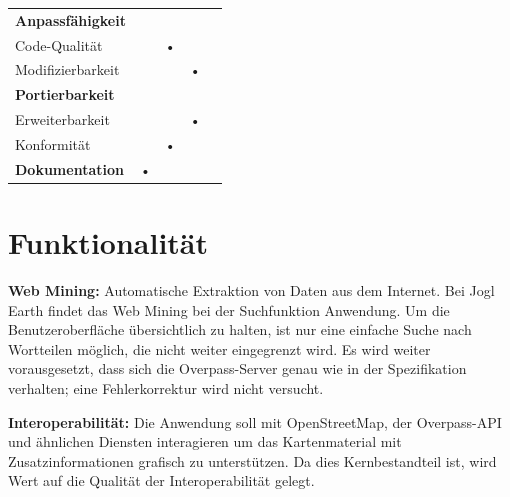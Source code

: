 \documentclass[10pt]{scrreprt}
\newenvironment{details}[1][6pt]{%
  \parskip#1 \parindent6mm \raggedright%
  \def\item{\par\ignorespaces\hangindent=5mm \hangafter1}}{%
  \par\ignorespaces}
\newcommand{\sfbf}[1]{\textbf{\sffamily #1}}
\begin{document}
\begin{center}
\begin{tabular}{lcccc}
\hline 
\rule[-1ex]{0pt}{4ex} \textbf{Anpassfähigkeit} &  &  &  &  \\ 
\rule[-1ex]{0pt}{4ex} \hspace{10pt} Code-Qualität & & • & & \\ 
\rule[-1ex]{0pt}{4ex} \hspace{10pt} Modifizierbarkeit & & & • & \\ 

\hline 
\rule[-1ex]{0pt}{4ex} \textbf{Portierbarkeit} &  &  &  &  \\ 
\rule[-1ex]{0pt}{4ex} \hspace{10pt} Erweiterbarkeit & & & • & \\ 
\rule[-1ex]{0pt}{4ex} \hspace{10pt} Konformität & & • & & \\ 

\hline 
\rule[-1ex]{0pt}{4ex} \textbf{Dokumentation} & • & & & \\ 
\hline 
\end{tabular} 
\end{center}

\pagebreak



\section*{Funktionalität}
\begin{details}
\item \sfbf{Web Mining:} Automatische Extraktion von Daten aus dem Internet. Bei Jogl Earth findet das Web Mining bei der Suchfunktion Anwendung. Um die Benutzeroberfläche übersichtlich zu halten, ist nur eine einfache Suche nach Wortteilen möglich, die nicht weiter eingegrenzt wird. Es wird weiter vorausgesetzt, dass sich die Overpass-Server genau wie in der Spezifikation verhalten; eine Fehlerkorrektur wird nicht versucht.

\item \textbf{Interoperabilität:} Die Anwendung soll mit OpenStreetMap, der Overpass-API und ähnlichen Diensten interagieren um das Kartenmaterial mit Zusatzinformationen grafisch zu unterstützen. Da dies Kernbestandteil ist, wird Wert auf die Qualität der Interoperabilität gelegt.
\end{details}
\end{document}
